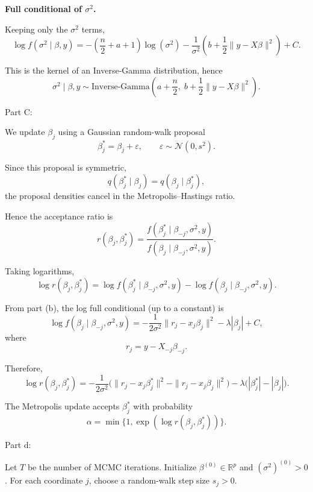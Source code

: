 \documentclass[hidelinks]{article}
\begin{document}
\noindent \textbf{Full conditional of $\sigma^2$.}

\noindent Keeping only the $\sigma^2$ terms,
\[
\log f(\sigma^2 \mid \beta,y)
=
-\left(\frac{n}{2}+a+1\right)\log(\sigma^2)
-\frac{1}{\sigma^2}
\left(
b + \frac{1}{2}\|y - X\beta\|^2
\right)
+ C.
\]

\noindent This is the kernel of an Inverse-Gamma distribution, hence
\[
\boxed{
\sigma^2 \mid \beta,y
\sim
\text{Inverse-Gamma}
\left(
a+\frac{n}{2},
\;
b+\frac{1}{2}\|y - X\beta\|^2
\right).
}
\]

\noindent Part C:

\noindent We update $\beta_j$ using a Gaussian random-walk proposal
\[
\beta_j^* = \beta_j + \varepsilon,
\qquad
\varepsilon \sim \mathcal{N}(0,s^2).
\]

\noindent Since this proposal is symmetric,
\[
q(\beta_j^* \mid \beta_j) = q(\beta_j \mid \beta_j^*),
\]
\noindent the proposal densities cancel in the Metropolis--Hastings ratio.

\noindent Hence the acceptance ratio is
\[
r(\beta_j,\beta_j^*)
=
\frac{
f(\beta_j^* \mid \beta_{-j},\sigma^2,y)
}{
f(\beta_j \mid \beta_{-j},\sigma^2,y)
}.
\]

\noindent Taking logarithms,
\[
\log r(\beta_j,\beta_j^*)
=
\log f(\beta_j^* \mid \beta_{-j},\sigma^2,y)
-
\log f(\beta_j \mid \beta_{-j},\sigma^2,y).
\]

\noindent From part (b), the log full conditional (up to a constant) is
\[
\log f(\beta_j \mid \beta_{-j},\sigma^2,y)
=
-\frac{1}{2\sigma^2}
\|r_j - x_j\beta_j\|^2
-\lambda |\beta_j|
+ C,
\]
\noindent where
\[
r_j = y - X_{-j}\beta_{-j}.
\]

\noindent Therefore,
\[
\boxed{
\log r(\beta_j,\beta_j^*)
=
-\frac{1}{2\sigma^2}
\Big(
\|r_j - x_j\beta_j^*\|^2
-
\|r_j - x_j\beta_j\|^2
\Big)
-
\lambda
\Big(
|\beta_j^*| - |\beta_j|
\Big).
}
\]

\noindent The Metropolis update accepts $\beta_j^*$ with probability
\[
\alpha
=
\min\{1,\exp(\log r(\beta_j,\beta_j^*))\}.
\]

\noindent Part d:

\noindent Let $T$ be the number of MCMC iterations. Initialize $\beta^{(0)} \in \mathbb{R}^p$ and $(\sigma^2)^{(0)} > 0$. 
For each coordinate $j$, choose a random-walk step size $s_j>0$.

\medskip
\end{document}

